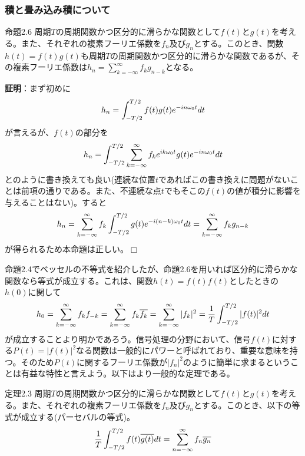 \documentclass[dvipdfmx, 9pt, a4paper]{jsarticle}
\def\qed{\hfill $\Box$}
\begin{document}
\subsubsection{積と畳み込み積について}
\begin{itembox}[l]{命題2.6}
周期$T$の周期関数かつ区分的に滑らかな関数として$f(t)$と$g(t)$を考える。また、それぞれの複素フーリエ係数を$f_n$及び$g_n$とする。このとき、関数$h(t)=f(t)g(t)$も周期$T$の周期関数かつ区分的に滑らかな関数であるが、その複素フーリエ係数は$h_n=\sum_{k=-\infty}^\infty f_kg_{n-k}$となる。
\end{itembox}
{\bf 証明}：まず初めに
\begin{equation}
h_n=\int_{-T/2}^{T/2}f(t)g(t)e^{-in\omega_0t}dt \notag
\end{equation}
が言えるが、$f(t)$の部分を
\begin{equation}
h_n=\int_{-T/2}^{T/2}\sum_{k=-\infty}^\infty f_ke^{ik\omega_0t} g(t)e^{-in\omega_0t}dt \notag
\end{equation}
とのように書き換えても良い(連続な位置$t$であればこの書き換えに問題がないことは前項の通りである。また、不連続な点$t$でもそこの$f(t)$の値が積分に影響を与えることはない)。すると
\begin{equation}
h_n=\sum_{k=-\infty}^\infty f_k\int_{-T/2}^{T/2}g(t)e^{-i(n-k)\omega_0t}dt=\sum_{k=-\infty}^\infty f_kg_{n-k} \notag
\end{equation}
が得られるため本命題は正しい。\qed \par
命題2.4でベッセルの不等式を紹介したが、命題2.6を用いれば区分的に滑らかな関数なら等式が成立する。これは、関数$h(t)=f(t)f(t)$としたときの$h(0)$に関して
\begin{equation}
h_0=\sum_{k=-\infty}^\infty f_kf_{-k}=\sum_{k=-\infty}^\infty f_k\overline{f_k}=\sum_{k=-\infty}^\infty |f_k|^2=\frac{1}{T}\int_{-T/2}^{T/2}|f(t)|^2dt \notag
\end{equation}
が成立することより明かであろう。信号処理の分野において、信号$f(t)$に対する$P(t)=|f(t)|^2$なる関数は一般的にパワーと呼ばれており、重要な意味を持つ。そのため$P(t)$に関するフーリエ係数が$|f_n|^2$のように簡単に求まるということは有益な特性と言えよう。以下はより一般的な定理である。
\begin{itembox}[l]{定理2.3}
周期$T$の周期関数かつ区分的に滑らかな関数として$f(t)$と$g(t)$を考える。また、それぞれの複素フーリエ係数を$f_n$及び$g_n$とする。このとき、以下の等式が成立する(パーセバルの等式)。
\begin{equation}
\frac{1}{T}\int_{-T/2}^{T/2}f(t)\overline{g(t)}dt=\sum_{n=-\infty}^\infty f_n\overline{g_n} \notag
\end{equation}
\end{itembox}
\end{document}

